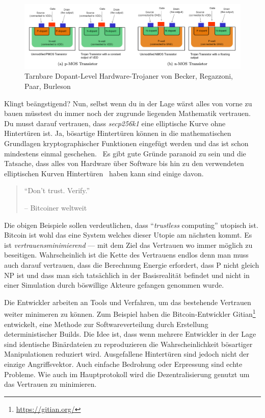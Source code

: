 \begin{figure}
  \includegraphics{assets/images/stealthy-hardware-trojan.png}
  \caption{Tarnbare Dopant-Level Hardware-Trojaner von Becker, Regazzoni, Paar, Burleson}
  \label{fig:stealthy-hardware-trojan}
\end{figure}

Klingt beängstigend? Nun, selbst wenn du in der Lage wärst alles von vorne zu
bauen müsstest du immer noch der zugrunde liegenden Mathematik vertrauen. Du
musst darauf vertrauen, dass \textit{secp256k1} eine elliptische Kurve ohne
Hintertüren ist. Ja, bösartige Hintertüren können in die mathematischen
Grundlagen kryptographischer Funktionen eingefügt werden und das ist schon
mindestens einmal geschehen.~\cite{wiki:Dual_EC_DRBG} Es gibt gute Gründe
paranoid zu sein und die Tatsache, dass alles von Hardware über Software bis hin
zu den verwendeten elliptischen Kurven Hintertüren~\cite{wiki:backdoors} haben
kann sind einige davon.

\begin{quotation}\begin{samepage}
\enquote{Don't trust. Verify.}
\begin{flushright} -- Bitcoiner weltweit
\end{flushright}\end{samepage}\end{quotation}

Die obigen Beispiele sollen verdeutlichen, dass \enquote{\textit{trustless}
computing} utopisch ist. Bitcoin ist wohl das eine System welches dieser Utopie
am nächsten kommt. Es ist \textit{vertrauensminimierend} — mit dem Ziel das
Vertrauen wo immer möglich zu beseitigen. Wahrscheinlich ist die Kette des
Vertrauens endlos denn man muss auch darauf vertrauen, dass die Berechnung
Energie erfordert, dass P nicht gleich NP ist und dass man sich tatsächlich in
der Basisrealität befindet und nicht in einer Simulation durch böswillige
Akteure gefangen genommen wurde.

Die Entwickler arbeiten an Tools und Verfahren, um das bestehende Vertrauen
weiter minimeren zu können. Zum Beispiel haben die Bitcoin-Entwickler
Gitian\footnote{\url{https://gitian.org/}} entwickelt, eine Methode zur
Softwareverteilung durch Erstellung deterministischer Builds. Die Idee ist, dass
wenn mehrere Entwickler in der Lage sind identische Binärdateien zu
reproduzieren die Wahrscheinlichkeit bösartiger Manipulationen reduziert wird.
Ausgefallene Hintertüren sind jedoch nicht der einzige Angriffsvektor. Auch
einfache Bedrohung oder Erpressung sind echte Probleme. Wie auch im
Hauptprotokoll wird die Dezentralisierung genutzt um das Vertrauen zu
minimieren.

